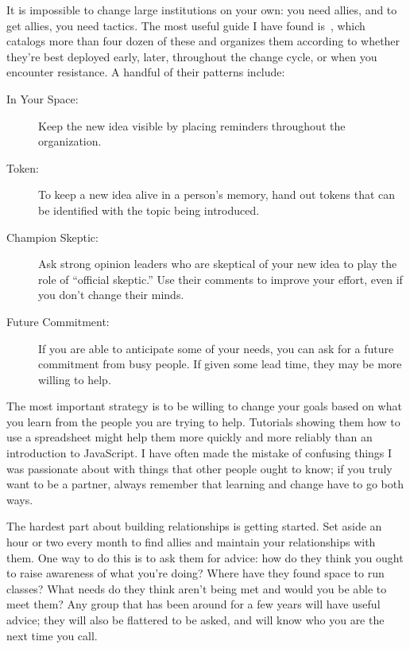 
It is impossible to change large institutions on your own:
you need allies,
and to get allies,
you need tactics.
The most useful guide I have found is~\cite{Mann2015},
which catalogs more than four dozen of these
and organizes them according to whether they're best deployed early,
later,
throughout the change cycle,
or when you encounter resistance.
A handful of their patterns include:

\begin{description}

\item[In Your Space:]
  Keep the new idea visible
  by placing reminders throughout the organization.

\item[Token:]
  To keep a new idea alive in a person's memory,
  hand out tokens that can be identified with the topic being introduced.

\item[Champion Skeptic:]
  Ask strong opinion leaders who are skeptical of your new idea
  to play the role of ``official skeptic.''
  Use their comments to improve your effort,
  even if you don't change their minds.

\item[Future Commitment:]
  If you are able to anticipate some of your needs,
  you can ask for a future commitment from busy people.
  If given some lead time,
  they may be more willing to help.
  
\end{description}

The most important strategy is
to be willing to change your goals
based on what you learn from the people you are trying to help.
Tutorials showing them how to use a spreadsheet
might help them more quickly and more reliably than
an introduction to JavaScript.
I have often made the mistake of confusing things I was passionate about
with things that other people ought to know;
if you truly want to be a partner,
always remember that learning and change have to go both ways.

The hardest part about building relationships is getting started.
Set aside an hour or two every month
to find allies and maintain your relationships with them.
One way to do this is to ask them for advice:
how do they think you ought to raise awareness of what you're doing?
Where have they found space to run classes?
What needs do they think aren't being met
and would you be able to meet them?
Any group that has been around for a few years will have useful advice;
they will also be flattered to be asked,
and will know who you are the next time you call.

